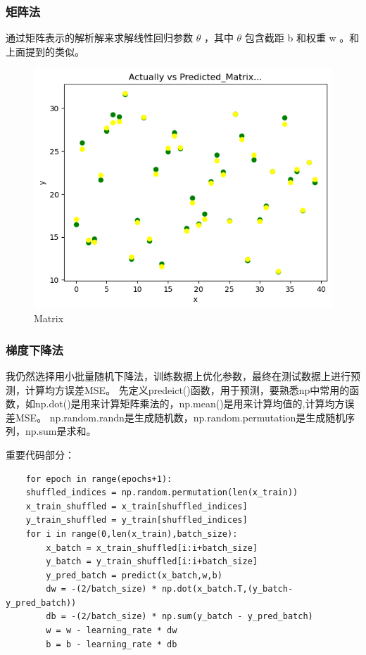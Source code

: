 \documentclass[12pt,a4paper,oneside]{article}
\begin{document}
\subsubsection{矩阵法}
通过矩阵表示的解析解来求解线性回归参数  $\theta$ ，其中  $\theta$  包含截距  b  和权重  w 。和上面提到的类似。
\begin{figure}[H]
    \centering
    \begin{minipage}[b]{0.6\textwidth}
        \centering
        \includegraphics[width=\textwidth]{3M.png}
        \caption{Matrix}
        \label{fig:code}
    \end{minipage}
\end{figure}
\subsubsection{梯度下降法}
我仍然选择用小批量随机下降法，训练数据上优化参数，最终在测试数据上进行预测，计算均方误差MSE。
先定义predeict()函数，用于预测，要熟悉np中常用的函数，如np.dot()是用来计算矩阵乘法的，np.mean()是用来计算均值的,计算均方误差MSE。
np.random.randn是生成随机数，np.random.permutation是生成随机序列，np.sum是求和。

重要代码部分：
\begin{lstlisting}
    for epoch in range(epochs+1):
    shuffled_indices = np.random.permutation(len(x_train))
    x_train_shuffled = x_train[shuffled_indices]
    y_train_shuffled = y_train[shuffled_indices]
    for i in range(0,len(x_train),batch_size):
        x_batch = x_train_shuffled[i:i+batch_size]
        y_batch = y_train_shuffled[i:i+batch_size]
        y_pred_batch = predict(x_batch,w,b)
        dw = -(2/batch_size) * np.dot(x_batch.T,(y_batch-y_pred_batch))
        db = -(2/batch_size) * np.sum(y_batch - y_pred_batch)
        w = w - learning_rate * dw
        b = b - learning_rate * db
\end{lstlisting}
\end{document}
